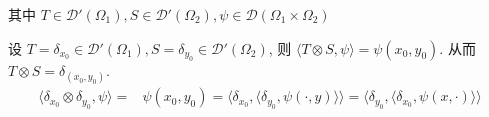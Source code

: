 \documentclass[11pt]{ctexart}[UTF8]
\begin{document}
\begin{remark}
    其中 $T \in \mathscr{D}'(\Omega_1), S \in \mathscr{D}'(\Omega_2), \psi \in \mathscr{D}(\Omega_1 \times \Omega_2)$
\end{remark}
\begin{example}
    设 $T = \delta_{x_0} \in \mathscr{D}'(\Omega_1), S = \delta_{y_0} \in \mathscr{D}'(\Omega_2)$, 则 $\langle T \otimes S, \psi \rangle = \psi(x_0,y_0)$. 从而 $T \otimes S = \delta_{(x_0,y_0)}$.
    \begin{equation*}
        \begin{aligned}
            \langle \delta_{x_0}\otimes \delta_{y_0}, \psi \rangle = & \psi(x_0,y_0) = \langle \delta_{x_0}, \langle \delta_{y_0}, \psi(\cdot,y) \rangle \rangle = \langle \delta_{y_0}, \langle \delta_{x_0}, \psi(x,\cdot) \rangle \rangle
        \end{aligned}
    \end{equation*}
\end{example}
\end{document}
